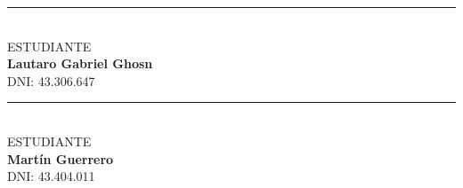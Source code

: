 \vspace{4cm}

\noindent
\begin{minipage}[t]{0.45\textwidth}
\centering
\rule{6.5cm}{0.4pt} \\
ESTUDIANTE \\
\textbf{Lautaro Gabriel Ghosn} \\
{\small DNI: 43.306.647}
\end{minipage}
\hfill
\begin{minipage}[t]{0.45\textwidth}
\centering
\rule{6.5cm}{0.4pt} \\
ESTUDIANTE \\
\textbf{Martín Guerrero} \\
{\small DNI: 43.404.011}
\end{minipage}
